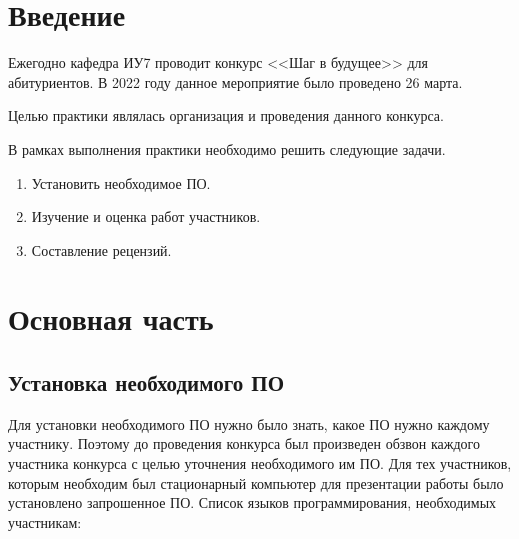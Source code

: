 \documentclass[12pt]{report}
\begin{document}


\tableofcontents

\chapter*{Введение}

Ежегодно кафедра ИУ7 проводит конкурс <<Шаг в будущее>> для абитуриентов.
В 2022 году данное мероприятие было проведено 26 марта. 

Целью практики являлась организация и проведения данного конкурса.

В рамках выполнения практики необходимо решить следующие задачи.

\begin{enumerate}
	\item Установить необходимое ПО.
	\item Изучение и оценка работ участников.
	\item Составление рецензий.
\end{enumerate}

\chapter{Основная часть}

\section{Установка необходимого ПО}

Для установки необходимого ПО нужно было знать, какое ПО нужно каждому участнику.
Поэтому до проведения конкурса был произведен обзвон каждого участника конкурса с целью 
уточнения необходимого им ПО. Для тех участников, которым необходим был стационарный компьютер
для презентации работы было установлено запрошенное ПО.
Список языков программирования, необходимых участникам:
\end{document}
